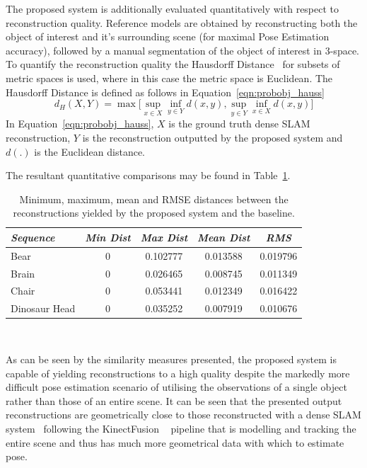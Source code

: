 The proposed system is additionally evaluated quantitatively with respect to reconstruction 
quality. Reference models are obtained by reconstructing both the object of interest and it's 
surrounding scene (for maximal Pose Estimation accuracy), followed by a manual segmentation of 
the object of interest in 3-space. To quantify the reconstruction quality the Hausdorff 
Distance~\cite{Rote1991} for subsets of metric spaces is used, where in this case the metric 
space is Euclidean. The Hausdorff Distance is defined as follows in Equation~\ref{eqn:probobj_hauss}
\begin{equation}
  \label{eqn:probobj_hauss}
  d_{H}(X, Y) = \max \Bigg[
  \sup_{x \in X} \inf_{y \in Y} d(x, y), \sup_{y \in Y} \inf_{x \in X} d(x, y) 
  \Bigg]
\end{equation}
In Equation~\ref{eqn:probobj_hauss}, \(X\) is the ground truth dense SLAM reconstruction, 
\(Y\) is the reconstruction outputted by the proposed system and \(d(.)\) is the Euclidean 
distance.

The resultant quantitative comparisons may be found in Table~\ref{table:probobj_hauss}.
\begin{table}[!htbp]
  \centering
  \begin{tabular}{lcccc}
    \emph{Sequence} & \emph{Min Dist} & \emph{Max Dist} & \emph{Mean Dist} & \emph{RMS}\\
    \midrule
    \textsf{Bear} & 0 & 0.102777 & 0.013588 & 0.019796 \\
    \textsf{Brain} & 0 & 0.026465 & 0.008745 & 0.011349 \\
    \textsf{Chair} & 0 & 0.053441 & 0.012349 & 0.016422 \\
    \textsf{Dinosaur Head} & 0 & 0.035252 & 0.007919 & 0.010676
  \end{tabular}
  \caption[Probabilistic Object Reconstruction Hausdorff Distance]
  {Minimum, maximum, mean and RMSE distances between the reconstructions yielded by 
  the proposed system and the baseline.}
~\label{table:probobj_hauss}
\end{table}

As can be seen by the similarity measures presented, the proposed system is capable of 
yielding reconstructions to a high quality despite the markedly more difficult pose estimation 
scenario of utilising the observations of a single object rather than those of an entire scene. 
It can be seen that the presented output reconstructions are geometrically close to those 
reconstructed with a dense SLAM system~\cite{Prisacariu2014} following the KinectFusion 
~\cite{Newcombe2011} pipeline that is modelling and tracking the entire scene and thus has 
much more geometrical data with which to estimate pose.


